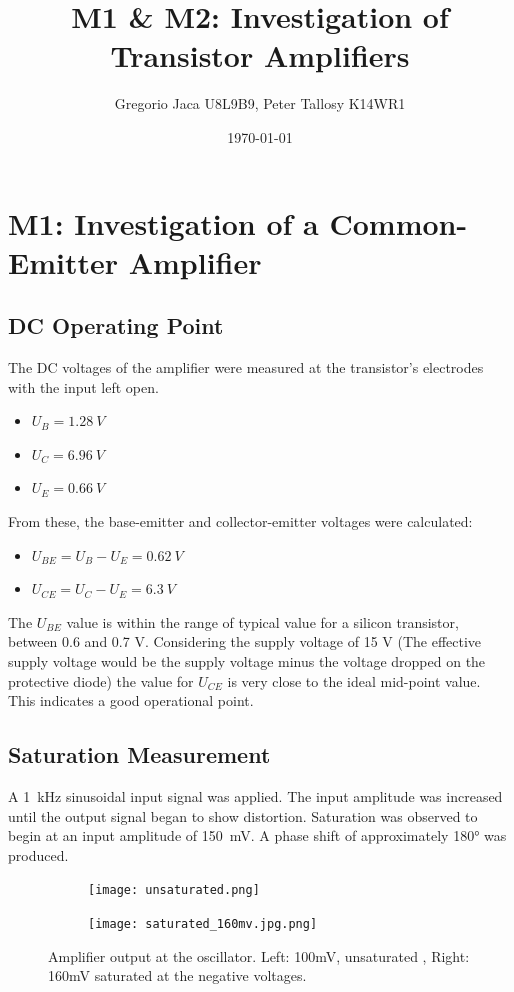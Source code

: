 \documentclass[12pt,a4paper]{article}
\title{M1 & M2: Investigation of Transistor Amplifiers}
\author{Gregorio Jaca U8L9B9, Peter Tallosy K14WR1 }
\date{\today}
\begin{document}

\section{M1: Investigation of a Common-Emitter Amplifier}

\subsection{DC Operating Point}
The DC voltages of the amplifier were measured at the transistor's electrodes with the input left open.
\begin{itemize}
    \item $U_B = \SI{1.28}{V}$
    \item $U_C = \SI{6.96}{V}$
    \item $U_E = \SI{0.66}{V}$
\end{itemize}
From these, the base-emitter and collector-emitter voltages were calculated:
\begin{itemize}
    \item $U_{BE} = U_B - U_E = \SI{0.62}{V}$
    \item $U_{CE} = U_C - U_E = \SI{6.3}{V}$
\end{itemize}

The $U_{BE}$ value is within the range of typical value for a silicon transistor, between 0.6 and 0.7 V. Considering the supply voltage of 15 V (The effective supply voltage would be the supply voltage minus the voltage dropped on the protective diode) the value for $U_{CE}$ is very close to the ideal mid-point value. This indicates a good operational point.

\subsection{Saturation Measurement}
A \SI{1}{kHz} sinusoidal input signal was applied. The input amplitude was increased until the output signal began to show distortion. Saturation was observed to begin at an input amplitude of \SI{150}{mV}. A phase shift of approximately 180° was produced. 

\begin{figure}[H]
    \centering
    \begin{subfigure}[b]{0.48\linewidth}
        \centering
        \texttt{[image: unsaturated.png]}
    \end{subfigure}\hfill
    \begin{subfigure}[b]{0.48\linewidth}
        \centering
        \texttt{[image: saturated\_160mv.jpg.png]}
    \end{subfigure}
    \caption{Amplifier output at the oscillator. Left: 100mV, unsaturated , Right: 160mV saturated at the negative voltages.}
    \label{fig:oscilloscope}
\end{figure}
\end{document}
